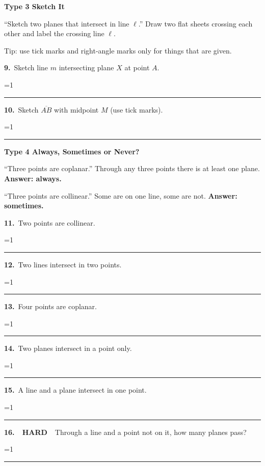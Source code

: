 \documentclass[11pt,letterpaper]{article}
\newcommand{\leveltag}[2]{\colorbox{#1}{\color{white}\bfseries\scriptsize\ #2\ }}
\newcommand{\LH}{\leveltag{fmmistake}{HARD}}
\newcommand{\topicbar}[1]{\needspace{4.5cm}\par\vspace{5mm}
  \begin{tcolorbox}[enhanced,colback=fmtitle,colframe=fmtitle,arc=2mm,left=4mm,top=1.5mm,bottom=1.5mm]
  \color{white}\bfseries\large #1
  \end{tcolorbox}}
\providecommand{\iskey}{0}
\newcommand{\pans}[2][3.2cm]{\ifnum\iskey=1 \underline{\makebox[#1][c]{\color{fmmistake}\bfseries #2}}\else\rule{#1}{0.4pt}\fi}
\newcommand{\sdp}[3]{\begin{minipage}[t][2.4cm]{0.48\linewidth}{\color{fmturn}\bfseries #1.}\ #2\par\vfill\hfill \pans[3.6cm]{#3}\end{minipage}}
\newcommand{\algp}[3]{\begin{minipage}[t][4.6cm]{0.48\linewidth}{\color{fmturn}\bfseries #1.}\ #2\par\vfill\hfill \pans[4.2cm]{#3}\end{minipage}}
\newlength{\pw}
\renewcommand{\pans}[2][3.2cm]{\ifnum\iskey=1 \settowidth{\pw}{\bfseries #2}\ifdim\pw>#1 \parbox[b]{#1}{\raggedleft\color{fmmistake}\bfseries\small #2}\else\underline{\makebox[#1][c]{\color{fmmistake}\bfseries #2}}\fi\else\rule{#1}{0.4pt}\fi}
\begin{document}
\needspace{6cm}\topicbar{Type 3 \quad Sketch It}
\begin{watchme}``Sketch two planes that intersect in line $\ell$.'' Draw two flat sheets crossing each other and label the crossing line $\ell$.\par
Tip: use tick marks and right-angle marks only for things that are given.\end{watchme}
\needspace{4.6cm}\noindent\algp{9}{Sketch line $m$ intersecting plane $X$ at point $A$.}{a line piercing the plane at $A$}\hfill\algp{10}{Sketch $\overline{AB}$ with midpoint $M$ (use tick marks).}{$AM$ and $MB$ each with one tick}\par

\needspace{6cm}\topicbar{Type 4 \quad Always, Sometimes or Never?}
\begin{watchme}``Three points are coplanar.'' \quad Through any three points there is at least one plane. \quad \textbf{Answer: always.}\par
``Three points are collinear.'' \quad Some are on one line, some are not. \quad \textbf{Answer: sometimes.}\end{watchme}
\needspace{3.4cm}\noindent\sdp{11}{Two points are collinear.}{always}\hfill\sdp{12}{Two lines intersect in two points.}{never}\par\vspace{2mm}
\needspace{3.4cm}\noindent\sdp{13}{Four points are coplanar.}{sometimes}\hfill\sdp{14}{Two planes intersect in a point only.}{never}\par\vspace{2mm}
\needspace{3.4cm}\noindent\sdp{15}{A line and a plane intersect in one point.}{sometimes}\hfill\sdp{16}{\LH\ Through a line and a point not on it, how many planes pass?}{exactly one}\par
\end{document}
